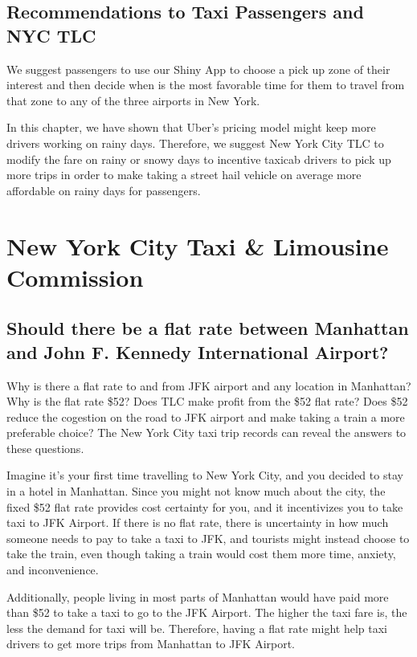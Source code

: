 \documentclass[12pt,twoside]{reedthesis}
\theoremstyle{definition}
\theoremstyle{definition}
\theoremstyle{definition}
\theoremstyle{remark}
\begin{document}
\section{Recommendations to Taxi Passengers and NYC
TLC}\label{recommendations-to-taxi-passengers-and-nyc-tlc}

We suggest passengers to use our Shiny App to choose a pick up zone of
their interest and then decide when is the most favorable time for them
to travel from that zone to any of the three airports in New York.

In this chapter, we have shown that Uber's pricing model might keep more
drivers working on rainy days. Therefore, we suggest New York City TLC
to modify the fare on rainy or snowy days to incentive taxicab drivers
to pick up more trips in order to make taking a street hail vehicle on
average more affordable on rainy days for passengers.

\chapter{New York City Taxi \& Limousine Commission}\label{chapter5}

\section{Should there be a flat rate between Manhattan and John F.
Kennedy International
Airport?}\label{should-there-be-a-flat-rate-between-manhattan-and-john-f.-kennedy-international-airport}

Why is there a flat rate to and from JFK airport and any location in
Manhattan? Why is the flat rate \$52? Does TLC make profit from the \$52
flat rate? Does \$52 reduce the cogestion on the road to JFK airport and
make taking a train a more preferable choice? The New York City taxi
trip records can reveal the answers to these questions.

Imagine it's your first time travelling to New York City, and you
decided to stay in a hotel in Manhattan. Since you might not know much
about the city, the fixed \$52 flat rate provides cost certainty for
you, and it incentivizes you to take taxi to JFK Airport. If there is no
flat rate, there is uncertainty in how much someone needs to pay to take
a taxi to JFK, and tourists might instead choose to take the train, even
though taking a train would cost them more time, anxiety, and
inconvenience.

Additionally, people living in most parts of Manhattan would have paid
more than \$52 to take a taxi to go to the JFK Airport. The higher the
taxi fare is, the less the demand for taxi will be. Therefore, having a
flat rate might help taxi drivers to get more trips from Manhattan to
JFK Airport.
\end{document}
